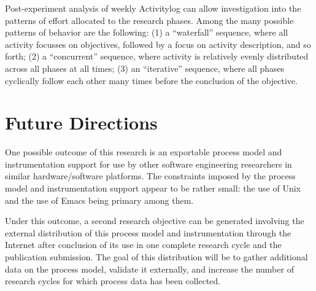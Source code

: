 Post-experiment analysis of weekly Activitylog can allow investigation into
the patterns of effort allocated to the research phases.  Among the many
possible patterns of behavior are the following: (1) a ``waterfall''
sequence, where all activity focusses on objectives, followed by a focus on
activity description, and so forth; (2) a ``concurrent'' sequence, where
activity is relatively evenly distributed across all phases at all times;
(3) an ``iterative'' sequence, where all phases cyclically follow each
other many times before the conclusion of the objective.

\section{Future Directions}
\label{sec:future}

One possible outcome of this research is an exportable process model and
instrumentation support for use by other software engineering researchers
in similar hardware/software platforms.  The constraints imposed by the
process model and instrumentation support appear to be rather small: the
use of Unix and the use of Emacs being primary among them.

Under this outcome, a second research objective can be generated involving
the external distribution of this process model and instrumentation through
the Internet after conclusion of its use in one complete research cycle and
the publication submission.  The goal of this distribution will be to
gather additional data on the process model, validate it externally, and
increase the number of research cycles for which process data has been
collected.



